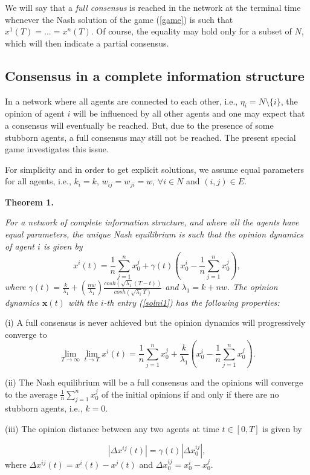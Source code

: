 \documentclass[10pt, conference, compsocconf]{IEEEtran}
\begin{document}
We will say that a {\it full consensus} is reached in the network at the terminal time whenever the Nash solution of the game (\ref{game}) is such that $x^1(T)=...=x^n(T)$.  Of course, the equality may hold only for a subset of $N$, which will then indicate a partial consensus.

 
\subsection{Consensus in a complete information structure}

In a network where all agents are connected to each other, i.e., $\eta_i=N\setminus \{i\}$, the opinion of agent $i$ will be influenced  by all other agents and one may expect that a consensus will eventually be reached. But, due to the presence of some stubborn agents, a full consensus  may still not be reached. The present special game investigates this issue.

For simplicity and in order to get explicit solutions, we assume equal parameters for all agents, i.e., $k_i = k$, $w_{ij} = w_{ji} = w$, $\forall i \in N$ and $(i,j) \in E$.

{\bf Theorem 1.} {\it For a network of complete information structure, and where all the agents have equal parameters, the unique  Nash equilibrium is such that the opinion dynamics of agent $i$ is given by
\begin{equation} \label{solni1}
	x^i(t) = \frac{1}{n}\sum_{j=1}^n x_0^j + \gamma(t) ( x_0^i - \frac{1}{n}\sum_{j=1}^{n} x_0^j),
\end{equation}
where $\gamma(t) = \frac{k}{\lambda_1} + \left( \frac{nw}{\lambda_1} \right) \frac{cosh(\sqrt{\lambda_1}(T-t))}{cosh(\sqrt{\lambda_1}T)}$ and $\lambda_1 = k+nw$. The opinion dynamics $\mathbf{x}(t)$ with the $i$-th entry (\ref{solni1}) has the following properties:

(i) A full consensus is never achieved but the opinion dynamics will progressively converge to
\begin{equation}
	\lim_{T\rightarrow \infty}\lim_{t\rightarrow T}  x^i(t) = \frac{1}{n} \sum_{j=1}^n x_0^j + \frac{k}{\lambda_1} (x_0^i - \frac{1}{n}\sum_{j=1}^{n} x_0^j).
\end{equation}

(ii) The Nash equilibrium will be a full consensus and the opinions will converge to the average $\frac{1}{n} \sum_{j=1}^n x_0^j$ of the initial opinions if and only if there are no stubborn agents, i.e., $k=0$.

(iii) The opinion distance between any two agents at time $t\in [0,T]$ is given by}
\begin{equation}
	|\Delta x^{ij}(t)| = \gamma(t) |\Delta x_0^{ij}|,
\end{equation}
where $\Delta x^{ij}(t) = x^i(t) - x^j(t)$ and $\Delta x_0^{ij} = x_0^i - x_0^j$.
\end{document}
